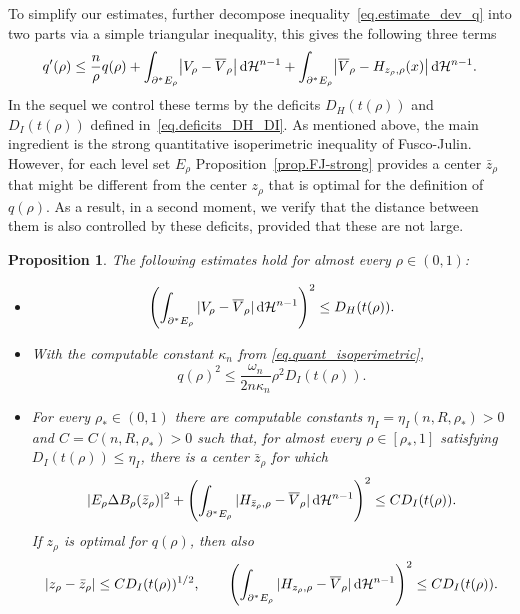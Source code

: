 \documentclass[11pt]{amsart}
\newcommand{\propname}{Proposition}
\theoremstyle{plain}
\newtheorem{proposition}[theorem]{\propname}
\theoremstyle{definition}
\newcommand{\dHn}{\,\dd\mathcal{H}^{n-1}}
\def\dd{{\rm d}}
\begin{document}
To simplify our estimates, further decompose inequality~\eqref{eq.estimate_dev_q} into two parts via a simple triangular inequality, this gives the following three terms
\begin{equation}\label{eq.estimate_dev_q_3terms}
  q'(\rho) \le \frac{n}{\rho}q(\rho)
  +\int_{\partial^*E_\rho}\bigl|V_\rho-\overline{V}_\rho\bigr|\dHn
  +\int_{\partial^*E_\rho}\bigl|\overline{V}_\rho-H_{z_\rho,\rho}(x)\bigr|\dHn.
\end{equation}
In the sequel we control these terms by the deficits
$D_H(t(\rho))$ and $D_I(t(\rho))$ defined in~\eqref{eq.deficits_DH_DI}. As mentioned above, the main ingredient is the strong quantitative isoperimetric inequality of Fusco-Julin. However, for each level set $E_\rho$ Proposition~\ref{prop.FJ-strong} provides a center $\bar z_\rho$ that might be different from the center $z_\rho$ that is optimal for the definition of $q(\rho)$. As a result, in a second moment, we verify that the distance between them is also controlled by these deficits, provided that these are not large.

\begin{proposition}\label{prop.estimates_q'_DH_DI}
The following estimates hold for almost every $\rho\in(0,1)$:
\begin{itemize}
\item[(1)]
  \[
     \left(\int_{\partial^*E_\rho}
    |V_\rho-\overline V_\rho|\dHn\right)^2
    \le D_H(t(\rho)).
 \]
 \item[(2)] With the computable constant $\kappa_n$ from
\eqref{eq.quant_isoperimetric},
\[
 q(\rho)^2
 \le\frac{\omega_n}{2n\kappa_n}\rho^2D_I(t(\rho)).
\]
\item[(3)] For every $\rho_*\in(0,1)$ there are computable constants
$\eta_I=\eta_I(n,R,\rho_*)>0$ and $C=C(n,R,\rho_*)>0$ such that, for almost
every $\rho\in[\rho_*,1]$ satisfying
$D_I(t(\rho))\le\eta_I$, there is a center $\bar z_\rho$ for which
\[
 |E_\rho\Delta B_\rho(\bar z_\rho)|^2
 +\left(\int_{\partial^*E_\rho}
 |H_{\bar z_\rho,\rho}-\overline V_\rho|\dHn\right)^2
 \le C D_I(t(\rho)).
\]
If  $z_\rho$ is optimal for $q(\rho)$, then also
\[
 |z_\rho-\bar z_\rho|\le C D_I(t(\rho))^{1/2},
 \qquad
 \left(\int_{\partial^*E_\rho}
 |H_{z_\rho,\rho}-\overline V_\rho|\dHn\right)^2
 \le C D_I(t(\rho)).
\]
 \end{itemize}
\end{proposition}
\end{document}
